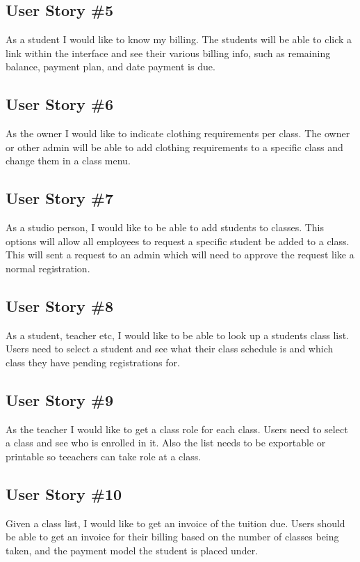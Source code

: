\subsection{User Story \#5}
As a student I would like to know my billing. The students will be able to click a link within the interface and see their various billing info, such as remaining balance, payment plan, and date payment is due.

\subsection{User Story \#6}
As the owner I would like to indicate clothing requirements per class. The owner or other admin will be able to add clothing requirements to a specific class and change them in a class menu.


\subsection{User Story \#7}
As a studio person, I would like to be able to add students to classes. This options will allow all employees to request a specific student be added to a class. This will sent a request to an admin which will need to approve the request like a normal registration.

\subsection{User Story \#8}
As a student, teacher etc, I would like to be able to look up a students class list. Users need to select a student and see what their class schedule is and which class they have pending registrations for.


\subsection{User Story \#9}
As the teacher I would like to get a class role for each class. Users need to select a class and see who is enrolled in it. Also the list needs to be exportable or printable so teeachers can take role at a class.

\subsection{User Story \#10}
Given a class list, I would like to get an invoice of the tuition due. Users should be able to get an invoice for their billing based on the number of classes being taken, and the payment model the student is placed under.

